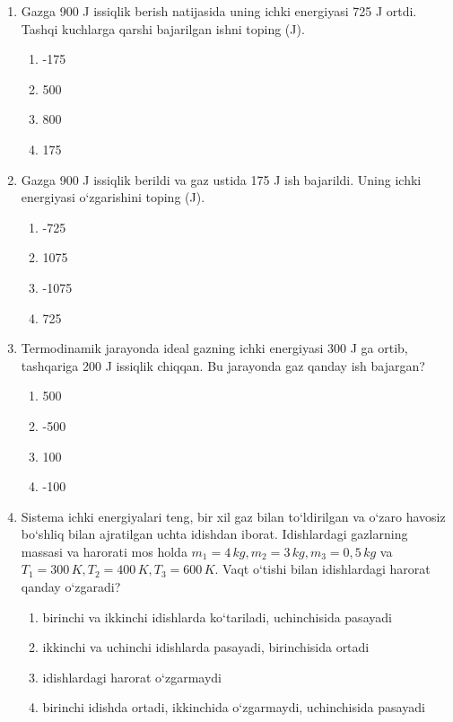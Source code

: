 \begin{enumerate}
\item Gazga 900 J issiqlik berish natijasida uning ichki energiyasi 725 J ortdi. Tashqi kuchlarga qarshi bajarilgan ishni toping (J).
\begin{enumerate}[label=\Alph*)]
\item -175
\item 500
\item 800
\item 175
\end{enumerate}

\item Gazga 900 J issiqlik berildi va gaz ustida 175 J ish bajarildi. Uning ichki energiyasi o‘zgarishini toping (J).
\begin{enumerate}[label=\Alph*)]
\item -725
\item 1075
\item -1075
\item 725
\end{enumerate}

\item Termodinamik jarayonda ideal gazning ichki energiyasi 300 J ga ortib, tashqariga 200 J issiqlik chiqqan. Bu jarayonda gaz qanday ish bajargan?
\begin{enumerate}[label=\Alph*)]
\item 500
\item -500
\item 100
\item -100
\end{enumerate}

\item Sistema ichki energiyalari teng, bir xil gaz bilan to‘ldirilgan va o‘zaro havosiz bo‘shliq bilan ajratilgan uchta idishdan iborat. Idishlardagi gazlarning massasi va harorati mos holda $m_1 = 4 \, kg, m_2 = 3 \, kg, m_3 = 0,5 \, kg$ va $T_1 = 300 \, K, T_2 = 400 \, K, T_3 = 600 \, K$. Vaqt o‘tishi bilan idishlardagi harorat qanday o‘zgaradi?
\begin{enumerate}[label=\Alph*)]
\item birinchi va ikkinchi idishlarda ko‘tariladi, uchinchisida pasayadi
\item ikkinchi va uchinchi idishlarda pasayadi, birinchisida ortadi
\item idishlardagi harorat o‘zgarmaydi
\item birinchi idishda ortadi, ikkinchida o‘zgarmaydi, uchinchisida pasayadi
\end{enumerate}


\end{enumerate}
